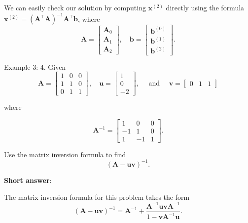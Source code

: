 We can easily check our solution by computing \(\boldsymbol{x}^{(2)}\) directly using the formula \(\boldsymbol{x}^{(2)}=\left(\boldsymbol{A}^{\top} \boldsymbol{A}\right)^{-1} \boldsymbol{A}^{\top} \boldsymbol{b}\), where
\[
\boldsymbol{A}=\left[\begin{array}{l}
	\boldsymbol{A}_0 \\
	\boldsymbol{A}_1 \\
	\boldsymbol{A}_2
\end{array}\right], \quad \boldsymbol{b}=\left[\begin{array}{l}
	\boldsymbol{b}^{(0)} \\
	\boldsymbol{b}^{(1)} \\
	\boldsymbol{b}^{(2)}
\end{array}\right].
\]


Example 3: 4. Given
\[
\boldsymbol{A}=\left[\begin{array}{lll}
	1 & 0 & 0 \\
	1 & 1 & 0 \\
	0 & 1 & 1
\end{array}\right], \quad \boldsymbol{u}=\left[\begin{array}{c}
	1 \\
	0 \\
	-2
\end{array}\right], \quad \text { and } \quad \boldsymbol{v}=\left[\begin{array}{lll}
	0 & 1 & 1
\end{array}\right]
\]

where

\[
\boldsymbol{A}^{-1}=\left[\begin{array}{ccc}
	1 & 0 & 0 \\
	-1 & 1 & 0 \\
	1 & -1 & 1
\end{array}\right] .
\]

Use the matrix inversion formula to find
\[
(\boldsymbol{A}-\boldsymbol{u} \boldsymbol{v})^{-1}.
\]

\textbf{Short answer}:

The matrix inversion formula for this problem takes the form
\[
(\boldsymbol{A}-\boldsymbol{u v})^{-1}=\boldsymbol{A}^{-1}+\frac{\boldsymbol{A}^{-1} \boldsymbol{u} \boldsymbol{v} \boldsymbol{A}^{-1}}{1-\boldsymbol{v} \boldsymbol{A}^{-1} \boldsymbol{u}}.
\]

